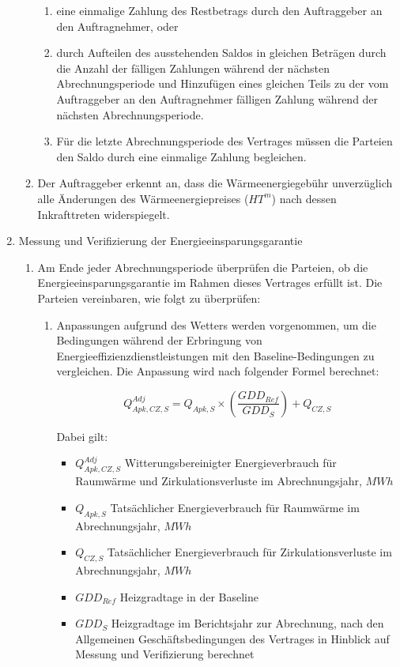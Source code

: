 \begin{enumerate}
\begin{enumerate}
\begin{enumerate}
\item eine einmalige Zahlung des Restbetrags durch den Auftraggeber an den Auftragnehmer, oder
\item durch Aufteilen des ausstehenden Saldos in gleichen Beträgen durch die Anzahl der fälligen Zahlungen während der nächsten Abrechnungsperiode und Hinzufügen eines gleichen Teils zu der vom Auftraggeber an den Auftragnehmer fälligen Zahlung während der nächsten Abrechnungsperiode. 
\item Für die letzte Abrechnungsperiode des Vertrages müssen die Parteien den Saldo durch eine einmalige Zahlung begleichen.
\end{enumerate}

\item Der Auftraggeber erkennt an, dass die Wärmeenergiegebühr unverzüglich alle Änderungen des Wärmeenergiepreises ($HT^m$) nach dessen Inkrafttreten widerspiegelt.

\end{enumerate}

\item{Messung und Verifizierung der Energieeinsparungsgarantie}

\begin{enumerate}

\item Am Ende jeder Abrechnungsperiode überprüfen die Parteien, ob die Energieeinsparungsgarantie im Rahmen dieses Vertrages erfüllt ist. Die Parteien vereinbaren, wie folgt zu überprüfen:

  \begin{enumerate}
    \item Anpassungen aufgrund des Wetters werden vorgenommen, um die Bedingungen während der Erbringung von Energieeffizienzdienstleistungen mit den Baseline-Bedingungen zu vergleichen. Die Anpassung wird nach folgender Formel berechnet:

      \[ Q^{Adj}_{Apk,CZ,S} = Q_{Apk,S} \times \left( \frac{GDD_{Ref}}{GDD_S}\right) + Q_{CZ,S} \]

      Dabei gilt:
      \begin{itemize}[label={}]
	\item $Q^{Adj}_{Apk,CZ,S}$ \quad Witterungsbereinigter Energieverbrauch für Raumwärme und Zirkulationsverluste im Abrechnungsjahr, $MWh$
	\item $Q_{Apk,S}$ \quad \quad Tatsächlicher Energieverbrauch für Raumwärme im Abrechnungsjahr, $MWh$
	\item $Q_{CZ,S}$ \quad \quad Tatsächlicher Energieverbrauch für Zirkulationsverluste im Abrechnungsjahr, $MWh$
	\item $GDD_{Ref}$ \quad  Heizgradtage in der Baseline
	\item $GDD_S$ \quad \quad Heizgradtage im Berichtsjahr zur Abrechnung, nach den Allgemeinen Geschäftsbedingungen des Vertrages in Hinblick auf Messung und Verifizierung berechnet
      \end{itemize}
      \vspace{1cm}


\end{enumerate}
\end{enumerate}
\end{enumerate}
